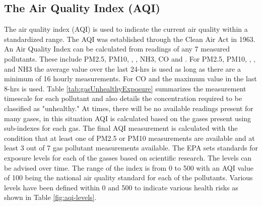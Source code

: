 \subsection{The Air Quality Index (AQI)}
The air quality index (AQI) is used to indicate the current air quality within a standardized range.
The AQI was established through the Clean Air Act in 1963. An Air Quality Index can be calculated
from readings of any 7 measured pollutants. These include PM2.5, PM10, \sdo, \nox, NH3, CO and
\ozone. For PM2.5, PM10, \sdo, \nox, and NH3 the average value over the last 24-hrs is used as long
as there are a minimum of 16 hourly measurements. For CO and \ozone the maximum value in the last
8-hrs is used. Table \ref{tab:gasUnhealthyExposure} summarizes the measurement timescale for each
pollutant and also details the concentration required to be classified as "unhealthy." At times,
there will be no available readings present for many gases, in this situation AQI is calculated
based on the gases present using sub-indexes for each gas. The final AQI measurement is calculated
with the condition that at least one of PM2.5 or PM10 measurements are available and at least 3 out
of 7 gas pollutant measurements available. The EPA sets standards for exposure levels for each of
the gasses based on scientific research. The levels can be advised over time. The range of the index
is from 0 to 500 with an AQI value of 100 being the national air quality standard for each of the
pollutants. Various levels have been defined within 0 and 500 to indicate various health risks as
shown in Table \ref{fig:aqi-levels}. 

